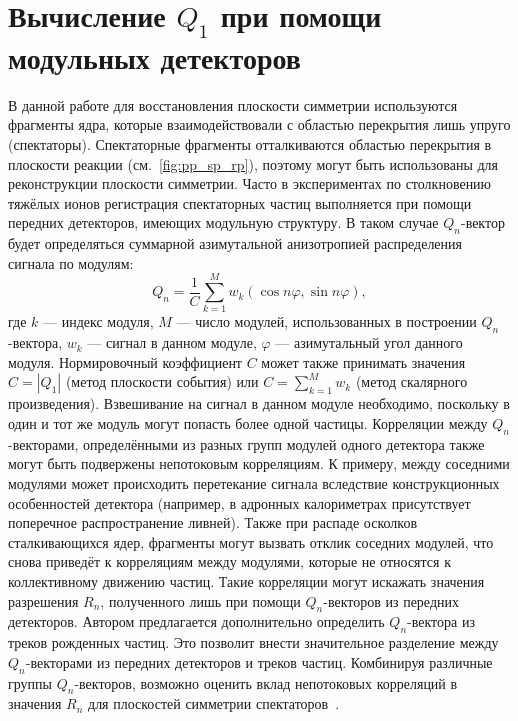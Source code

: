 \section{Вычисление $Q_1$ при помощи модульных детекторов}

В данной работе для восстановления плоскости симметрии используются фрагменты ядра, которые взаимодействовали с областью перекрытия лишь упруго (спектаторы). 
Спектаторные фрагменты отталкиваются областью перекрытия в плоскости реакции (см.~\ref{fig:pp_sp_rp}), поэтому могут быть использованы для реконструкции плоскости симметрии. 
Часто в экспериментах по столкновению тяжёлых ионов регистрация спектаторных частиц выполняется при помощи передних детекторов, имеющих модульную структуру. 
В таком случае $Q_n$-вектор будет определяться суммарной азимутальной анизотропией распределения сигнала по модулям:
%
\begin{equation}
    Q_n  = \frac{1}{C} \sum_{k=1}^M w_k ( \cos n \varphi, \sin n \varphi ),
\end{equation}
%
где $k$ --- индекс модуля, $M$ --- число модулей, использованных в построении $Q_n$-вектора, $w_k$ --- сигнал в данном модуле, $\varphi$ --- азимутальный угол данного модуля. 
Нормировочный коэффициент $C$ может также принимать значения $C=|Q_1|$ (метод плоскости события) или $C=\sum_{k=1}^M w_k$ (метод скалярного произведения).
Взвешивание на сигнал в данном модуле необходимо, поскольку в один и тот же модуль могут попасть более одной частицы.
Корреляции между $Q_n$-векторами, определёнными из разных групп модулей одного детектора также могут быть подвержены непотоковым корреляциям.
К примеру, между соседними модулями может происходить перетекание сигнала вследствие конструкционных особенностей детектора (например, в адронных калориметрах присутствует поперечное распространение ливней).
Также при распаде осколков сталкивающихся ядер, фрагменты могут вызвать отклик соседних модулей, что снова приведёт к корреляциям между модулями, которые не относятся к коллективному движению частиц.
Такие корреляции могут искажать значения разрешения $R_n$, полученного лишь при помощи $Q_n$-векторов из передних детекторов.
Автором предлагается дополнительно определить $Q_n$-вектора из треков рожденных частиц.
Это позволит внести значительное разделение между $Q_n$-векторами из передних детекторов и треков частиц.
Комбинируя различные группы $Q_n$-векторов, возможно оценить вклад непотоковых корреляций в значения $R_n$ для плоскостей симметрии спектаторов~\cite{Mamaev:2023fpr,Mamaev:2023yhz,Mamaev:2024}.

